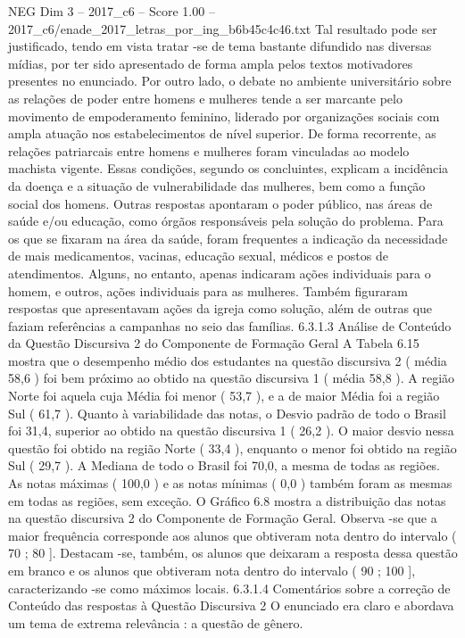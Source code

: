 \begin{textsample}{NEG Dim 3 – 2017\_c6 – Score 1.00 – 2017\_c6/enade\_2017\_letras\_por\_ing\_b6b45c4c46.txt}
Tal resultado pode ser justificado, tendo em vista tratar -se de tema bastante difundido nas diversas mídias, por ter sido apresentado de forma ampla pelos textos motivadores presentes no enunciado.
Por outro lado, o debate no ambiente universitário sobre as relações de poder entre homens e mulheres tende a ser marcante pelo movimento de empoderamento feminino, liderado por organizações sociais com ampla atuação nos estabelecimentos de nível superior.
De forma recorrente, as relações patriarcais entre homens e mulheres foram vinculadas ao modelo machista vigente.
Essas condições, segundo os concluintes, explicam a incidência da doença e a situação de vulnerabilidade das mulheres, bem como a função social dos homens.
Outras respostas apontaram o poder público, nas áreas de saúde e/ou educação, como órgãos responsáveis pela solução do problema.
Para os que se fixaram na área da saúde, foram frequentes a indicação da necessidade de mais medicamentos, vacinas, educação sexual, médicos e postos de atendimentos.
Alguns, no entanto, apenas indicaram ações individuais para o homem, e outros, ações individuais para as mulheres.
Também figuraram respostas que apresentavam ações da igreja como solução, além de outras que faziam referências a campanhas no seio das famílias. 6.3.1.3 Análise de Conteúdo da Questão Discursiva 2 do Componente de Formação Geral A Tabela 6.15 mostra que o desempenho médio dos estudantes na questão discursiva 2 ( média 58,6 ) foi bem próximo ao obtido na questão discursiva 1 ( média 58,8 ).
A região Norte foi aquela cuja Média foi menor ( 53,7 ), e a de maior Média foi a região Sul ( 61,7 ).
Quanto à variabilidade das notas, o Desvio padrão de todo o Brasil foi 31,4, superior ao obtido na questão discursiva 1 ( 26,2 ).
O maior desvio nessa questão foi obtido na região Norte ( 33,4 ), enquanto o menor foi obtido na região Sul ( 29,7 ).
A Mediana de todo o Brasil foi 70,0, a mesma de todas as regiões.
As notas máximas ( 100,0 ) e as notas mínimas ( 0,0 ) também foram as mesmas em todas as regiões, sem exceção.
O Gráfico 6.8 mostra a distribuição das notas na questão discursiva 2 do Componente de Formação Geral.
Observa -se que a maior frequência corresponde aos alunos que obtiveram nota dentro do intervalo ( 70 ; 80 ].
Destacam -se, também, os alunos que deixaram a resposta dessa questão em branco e os alunos que obtiveram nota dentro do intervalo ( 90 ; 100 ], caracterizando -se como máximos locais. 6.3.1.4 Comentários sobre a correção de Conteúdo das respostas à Questão Discursiva 2 O enunciado era claro e abordava um tema de extrema relevância : a questão de gênero.

\end{textsample}
